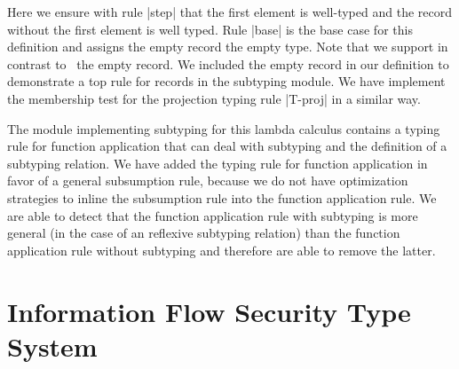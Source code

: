 Here we ensure with rule \code|step| that the first element is
well-typed and the record without the first element is well
typed. Rule \code|base| is the base case for this definition and
assigns the empty record the empty type. Note that we support in
contrast to~\cite{Pierce:2002:TPL:509043} the empty record. We
included the empty record in our definition to demonstrate a top rule
for records in the subtyping module. We have implement the membership
test for the projection typing rule \code|T-proj| in a similar way.

The module implementing subtyping for this lambda calculus contains a
typing rule for function application that can deal with subtyping and
the definition of a subtyping relation. We have added the typing rule
for function application in favor of a general subsumption rule,
because we do not have optimization strategies to inline the
subsumption rule into the function application rule. We are able to
detect that the function application rule with subtyping is more
general (in the case of an reflexive subtyping relation) than the
function application rule without subtyping and therefore are able to
remove the latter.



\section{Information Flow Security Type System}
\label{sec:inform-flow-secur-1}

